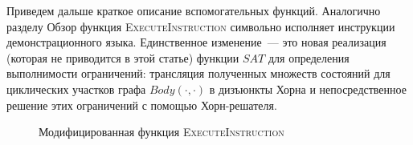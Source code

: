 Приведем дальше краткое описание вспомогательных функций.
Аналогично разделу Обзор функция \textsc{ExecuteInstruction} символьно исполняет инструкции демонстрационного языка. Единственное изменение~--- это новая реализация (которая не приводится в этой статье) функции $SAT$ для определения выполнимости ограничений: трансляция полученных множеств состояний для циклических участков графа $Body(\cdot,\cdot)$ в дизъюнкты Хорна и непосредственное решение этих ограничений с помощью Хорн-решателя.

\begin{figure}
\begin{algorithm2e}[H]
    \caption{Модифицированная функция \textsc{ExecuteInstruction}}
    \label{algorithm:execute_instruction}
    \small
    \SetAlgoSkip{}

\end{algorithm2e}
\end{figure}

